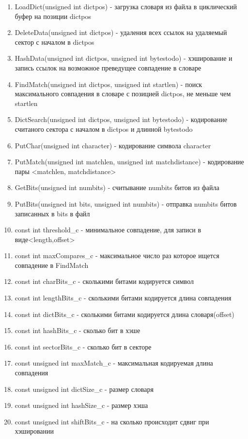 \documentclass[12pt]{article}
\begin{document}
\begin{enumerate}
	\item LoadDict(unsigned int dictpos) - загрузка словаря из файла в циклический буфер на позиции dictpos
	\item DeleteData(unsigned int dictpos) - удаления всех ссылок на удаляемый сектор с началом в dictpos
	\item HashData(unsigned int dictpos, unsigned int bytestodo) - хэширование и запись ссылок на возможное преведущее совпадение в словаре
	\item FindMatch(unsigned int dictpos, unsigned int startlen) - поиск максимального совпадения в словаре с позицией dictpos, не меньше чем startlen 
	\item DictSearch(unsigned int dictpos, unsigned int bytestodo) - кодирование считаного сектора с началом в dictpos и длинной bytestodo 
	\item PutChar(unsigned int character) - кодирование символа character
	\item PutMatch(unsigned int matchlen, unsigned int matchdistance) - кодирование пары <matchlen, matchdistance>
	\item GetBits(unsigned int numbits) - считывание numbits битов из файла
	\item PutBits(unsigned int bits, unsigned int numbits) - отправка numbits битов записанных в bits в файл
    \item const int threshold\_c - минимальное совпадение, для записи в виде<length,offset>
	\item const int maxCompares\_c   - максимальное число раз которое ищется совпадение в FindMatch
	\item const int charBits\_c	  - сколькими битами кодируется символ		
	\item const int lengthBits\_c  	  - сколькими битами кодируется длина совпадения		 
	\item const int dictBits\_c 	  - сколькими битами кодируется длина словаря(offset) 		
	\item const int hashBits\_c 	  - сколько бит в хэше
	\item const int sectorBits\_c 	  - сколько бит в секторе		
	\item const unsigned int maxMatch\_c - максимальная кодируемая длина совпадения
	\item const unsigned int dictSize\_c - размер словаря
	\item const unsigned int hashSize\_c - размер хэша
	\item const unsigned int shiftBits\_c	- на сколько происходит сдвиг при хэшировании

\end{enumerate}
\end{document}
